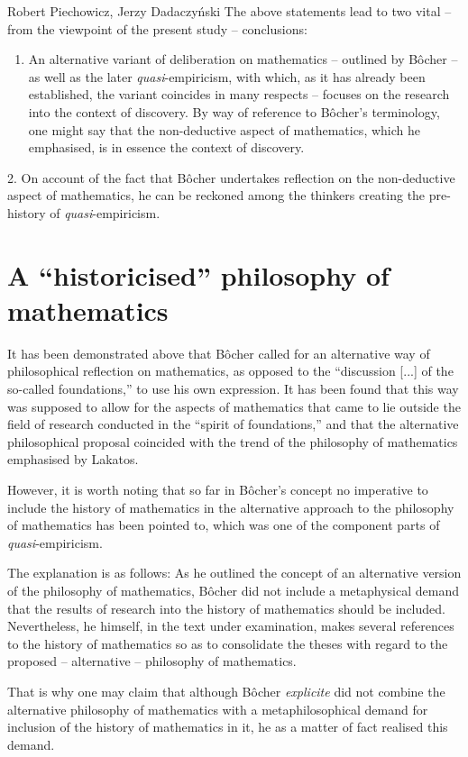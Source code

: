 \begin{artengenv}{Robert Piechowicz, Jerzy Dadaczyński}
The above statements lead to two vital -- from the viewpoint of the present study -- conclusions:

\begin{enumerate}
\item An alternative variant of deliberation on mathematics -- outlined by Bôcher -- as well as the later \textit{quasi}-empiricism, with which, as it has already been established, the variant coincides in many respects -- focuses on the research into the context of discovery. By way of reference to Bôcher's terminology, one might say that the non-deductive aspect of mathematics, which he emphasised, is in essence the context of discovery.
\end{enumerate}
2. On account of the fact that Bôcher undertakes reflection on the non-deductive aspect of mathematics, he can be reckoned among the thinkers creating the pre-history of \textit{quasi}-empiricism.

\section{A ``historicised'' philosophy of mathematics}
It has been demonstrated above that Bôcher called for an alternative way of philosophical reflection on mathematics, as opposed to the ``discussion [...] of the so-called foundations,'' to use his own expression. It has been found that this way was supposed to allow for the aspects of mathematics that came to lie outside the field of research conducted in the ``spirit of foundations,'' and that the alternative philosophical proposal coincided with the trend of the philosophy of mathematics emphasised by Lakatos.

However, it is worth noting that so far in Bôcher's concept no imperative to include the history of mathematics in the alternative approach to the philosophy of mathematics has been pointed to, which was one of the component parts of \textit{quasi}-empiricism.

The explanation is as follows: As he outlined the concept of an alternative version of the philosophy of mathematics, Bôcher did not include a metaphysical demand that the results of research into the history of mathematics should be included. Nevertheless, he himself, in the text under examination, makes several references to the history of mathematics so as to consolidate the theses with regard to the proposed -- alternative -- philosophy of mathematics.

That is why one may claim that although Bôcher \textit{explicite} did not combine the alternative philosophy of mathematics with a metaphilosophical demand for inclusion of the history of mathematics in it, he as a matter of fact realised this demand.


\end{artengenv}

